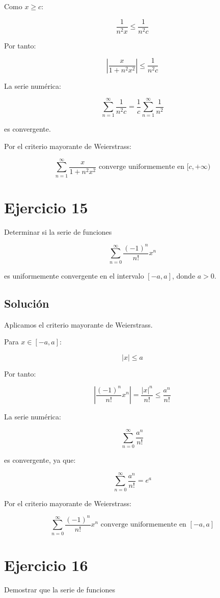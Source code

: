 \documentclass[fleqn]{article}
\begin{document}
	Como $x\geq c$:

	\[
	\frac{1}{n^2x}
	\leq
	\frac{1}{n^2c}
	\]

	Por tanto:

	\[
	\left|
	\frac{x}{1+n^2x^2}
	\right|
	\leq
	\frac{1}{n^2c}
	\]

	La serie numérica:

	\[
	\sum_{n=1}^{\infty}
	\frac{1}{n^2c}
	=
	\frac{1}{c}
	\sum_{n=1}^{\infty}
	\frac{1}{n^2}
	\]

	es convergente.

	Por el criterio mayorante de Weierstrass:

	\[
	\boxed{
	\sum_{n=1}^{\infty}
	\frac{x}{1+n^2x^2}
	\text{ converge uniformemente en }[c,+\infty)
	}
	\]

\section{Ejercicio 15}
	Determinar si la serie de funciones

	\[
	\sum_{n=0}^{\infty}
	\frac{(-1)^n}{n!}x^n
	\]

	es uniformemente convergente en el intervalo $[-a,a]$, donde $a>0$.

	\subsection{Solución}

	Aplicamos el criterio mayorante de Weierstrass.

	Para $x\in[-a,a]$:

	\[
	|x|\leq a
	\]

	Por tanto:

	\[
	\left|
	\frac{(-1)^n}{n!}x^n
	\right|
	=
	\frac{|x|^n}{n!}
	\leq
	\frac{a^n}{n!}
	\]

	La serie numérica:

	\[
	\sum_{n=0}^{\infty}\frac{a^n}{n!}
	\]

	es convergente, ya que:

	\[
	\sum_{n=0}^{\infty}\frac{a^n}{n!}
	=
	e^a
	\]

	Por el criterio mayorante de Weierstrass:

	\[
	\boxed{
	\sum_{n=0}^{\infty}
	\frac{(-1)^n}{n!}x^n
	\text{ converge uniformemente en }[-a,a]
	}
	\]

\section{Ejercicio 16}
	Demostrar que la serie de funciones
\end{document}
